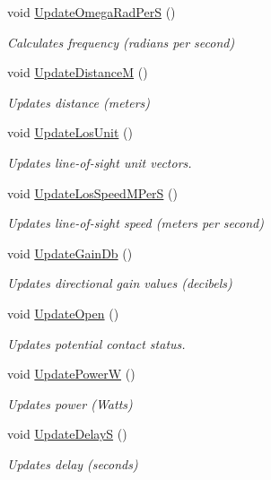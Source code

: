 \begin{DoxyCompactItemize}
void \hyperlink{classosse_1_1collaborate_1_1_channel_a7e37174d94c0da66432d7b0ace4b2ba4}{Update\+Omega\+Rad\+PerS} ()
\begin{DoxyCompactList}\small\item\em Calculates frequency (radians per second) \end{DoxyCompactList}\item 
void \hyperlink{classosse_1_1collaborate_1_1_channel_a89877e3e5c3cdfdd53b59001fea27b93}{Update\+DistanceM} ()
\begin{DoxyCompactList}\small\item\em Updates distance (meters) \end{DoxyCompactList}\item 
void \hyperlink{classosse_1_1collaborate_1_1_channel_a6fb6a52d46f410cb369e42be9a7213bf}{Update\+Los\+Unit} ()
\begin{DoxyCompactList}\small\item\em Updates line-\/of-\/sight unit vectors. \end{DoxyCompactList}\item 
void \hyperlink{classosse_1_1collaborate_1_1_channel_a757a6ce4a001b986bf3ab746b37ec3b7}{Update\+Los\+Speed\+M\+PerS} ()
\begin{DoxyCompactList}\small\item\em Updates line-\/of-\/sight speed (meters per second) \end{DoxyCompactList}\item 
void \hyperlink{classosse_1_1collaborate_1_1_channel_a95ee1344e01272f80d638f3cde164e9c}{Update\+Gain\+Db} ()
\begin{DoxyCompactList}\small\item\em Updates directional gain values (decibels) \end{DoxyCompactList}\item 
void \hyperlink{classosse_1_1collaborate_1_1_channel_a8f419e4573c12ba04b82c023c8f7326f}{Update\+Open} ()
\begin{DoxyCompactList}\small\item\em Updates potential contact status. \end{DoxyCompactList}\item 
void \hyperlink{classosse_1_1collaborate_1_1_channel_a1b086fb253ad06cdbaff229b9916ee7b}{Update\+PowerW} ()
\begin{DoxyCompactList}\small\item\em Updates power (Watts) \end{DoxyCompactList}\item 
void \hyperlink{classosse_1_1collaborate_1_1_channel_abd29033e2e6c9edbb5fd54923a444b26}{Update\+DelayS} ()
\begin{DoxyCompactList}\small\item\em Updates delay (seconds) \end{DoxyCompactList}\end{DoxyCompactItemize}
